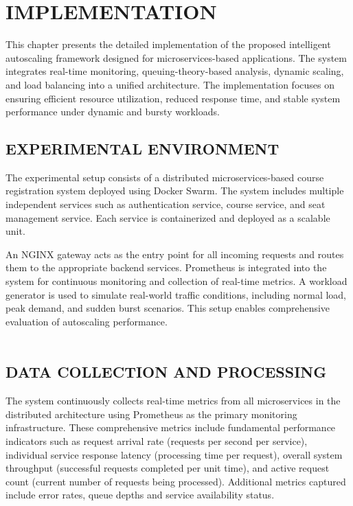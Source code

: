 \chapter{IMPLEMENTATION}

This chapter presents the detailed implementation of the proposed intelligent autoscaling framework designed for microservices-based applications. The system integrates real-time monitoring, queuing-theory-based analysis, dynamic scaling, and load balancing into a unified architecture. The implementation focuses on ensuring efficient resource utilization, reduced response time, and stable system performance under dynamic and bursty workloads.

\section{EXPERIMENTAL ENVIRONMENT}

The experimental setup consists of a distributed microservices-based course registration system deployed using Docker Swarm. The system includes multiple independent services such as authentication service, course service, and seat management service. Each service is containerized and deployed as a scalable unit.

An NGINX gateway acts as the entry point for all incoming requests and routes them to the appropriate backend services. Prometheus is integrated into the system for continuous monitoring and collection of real-time metrics. A workload generator is used to simulate real-world traffic conditions, including normal load, peak demand, and sudden burst scenarios. This setup enables comprehensive evaluation of autoscaling performance.\\
\\

\section{DATA COLLECTION AND PROCESSING}

The system continuously collects real-time metrics from all microservices in the distributed architecture using Prometheus as the primary monitoring infrastructure. These comprehensive metrics include fundamental performance indicators such as request arrival rate (requests per second per service), individual service response latency (processing time per request), overall system throughput (successful requests completed per unit time), and active request count (current number of requests being processed). Additional metrics captured include error rates, queue depths and service availability status.

